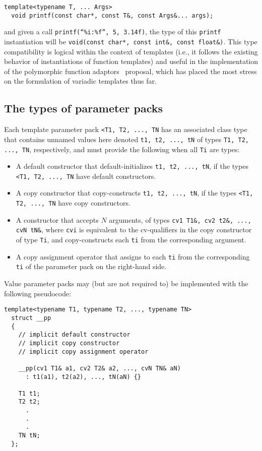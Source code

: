 \documentclass{article}
\begin{document}
\begin{verbatim}
template<typename T, ... Args>
  void printf(const char*, const T&, const Args&... args);
\end{verbatim}

and given a call {\tt printf(``\%i:\%f'', 5, 3.14f)}, the type of this
{\tt printf} instantiation will be {\tt void(const char*, const int\&,
  const float\&)}. This type compatibility is logical within the
context of templates (i.e., it follows the existing behavior of
instantiations of function templates) and useful in the
implementation of the polymorphic function adaptors~\cite{Gregor02}
proposal, which has placed the most stress on the formulation of
variadic templates thus far.

\subsection{The types of parameter packs}
Each template parameter pack \texttt{<T1, T2, ..., TN} has an
associated class type that contains unnamed values here denoted
\texttt{t1, t2, ..., tN} of types \texttt{T1, T2, ..., TN},
respectively, and must provide the following when all \texttt{Ti} are
types:
\begin{itemize}
\item A default constructor that default-initializes \texttt{t1, t2,
    ..., tN}, if the types \texttt{<T1, T2, ..., TN} have default
  constructors.
\item A copy constructor that copy-constructs \texttt{t1, t2,
    ..., tN}, if the types \texttt{<T1, T2, ..., TN} have copy
  constructors.
\item A constructor that accepts $N$ arguments, of types \texttt{cv1
    T1\&, cv2 t2\&, ..., cvN tN\&}, where \texttt{cvi} is equivalent to
  the cv-qualifiers in the copy constructor of type \texttt{Ti}, and
  copy-constructs each \texttt{ti} from the corresponding argument.

\item A copy assignment operator that assigns to each \texttt{ti} from
  the corresponding \texttt{ti} of the parameter pack on the
  right-hand side.
\end{itemize}

Value parameter packs may (but are not required to) be implemented
with the following pseudocode:
\begin{verbatim}
template<typename T1, typename T2, ..., typename TN>
  struct __pp
  {
    // implicit default constructor
    // implicit copy constructor
    // implicit copy assignment operator
   
    __pp(cv1 T1& a1, cv2 T2& a2, ..., cvN TN& aN)
      : t1(a1), t2(a2), ..., tN(aN) {}

    T1 t1;
    T2 t2;
      .
      .
      .
    TN tN;
  };
\end{verbatim}
\end{document}
